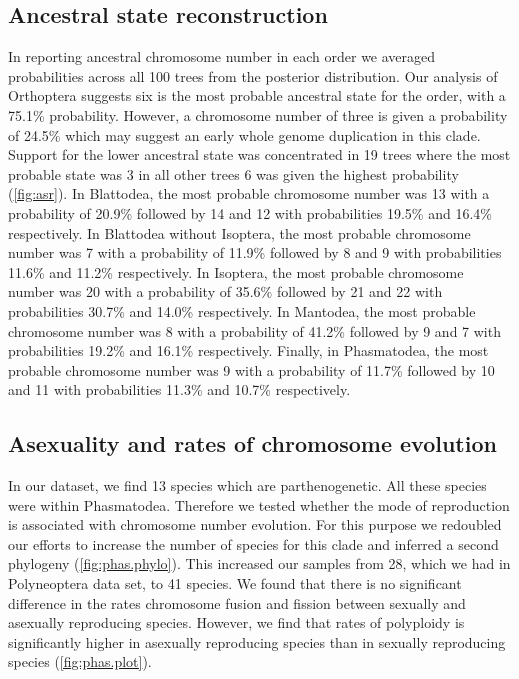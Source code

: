 \subsection{Ancestral state reconstruction}
In reporting ancestral chromosome number in each order we averaged probabilities across all 100 trees from the posterior distribution. 
Our analysis of Orthoptera suggests six is the most probable ancestral state for the order, with a 75.1\% probability.
However, a chromosome number of three is given a probability of 24.5\% which may suggest an early whole genome duplication in this clade.
Support for the lower ancestral state was concentrated in 19 trees where the most probable state was 3 in all other trees 6 was given the highest probability (\cref{fig:asr}). 
In Blattodea, the most probable chromosome number was 13 with a probability of 20.9\% followed by 14 and 12 with probabilities 19.5\% and 16.4\% respectively. 
In Blattodea without Isoptera, the most probable chromosome number was 7 with a probability of 11.9\% followed by 8 and 9 with probabilities 11.6\% and 11.2\% respectively.
In Isoptera, the most probable chromosome number was 20 with a probability of 35.6\% followed by 21 and 22 with probabilities 30.7\% and 14.0\% respectively.
In Mantodea, the most probable chromosome number was 8 with a probability of 41.2\% followed by 9 and 7 with probabilities 19.2\% and 16.1\% respectively.
Finally, in Phasmatodea, the most probable chromosome number was 9 with a probability of 11.7\% followed by 10 and 11 with probabilities 11.3\% and 10.7\% respectively.

\subsection{Asexuality and rates of chromosome evolution}
In our dataset, we find 13 species which are parthenogenetic.
All these species were within Phasmatodea.
Therefore we tested whether the mode of reproduction is associated with chromosome number evolution. 
For this purpose we redoubled our efforts to increase the number of species for this clade and inferred a second phylogeny (\cref{fig:phas.phylo}).
This increased our samples from 28, which we had in Polyneoptera data set, to 41 species. 
We found that there is no significant difference in the rates chromosome fusion and fission between sexually and asexually reproducing species.
However, we find that rates of polyploidy is significantly higher in asexually reproducing species than in sexually reproducing species (\cref{fig:phas.plot}).
